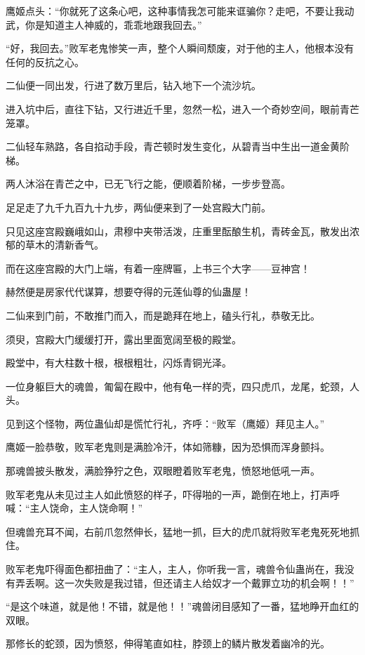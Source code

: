 \begin{this_body}
鹰姬点头：“你就死了这条心吧，这种事情我怎可能来诓骗你？走吧，不要让我动武，你是知道主人神威的，乖乖地跟我回去。”

“好，我回去。”败军老鬼惨笑一声，整个人瞬间颓废，对于他的主人，他根本没有任何的反抗之心。

二仙便一同出发，行进了数万里后，钻入地下一个流沙坑。

进入坑中后，直往下钻，又行进近千里，忽然一松，进入一个奇妙空间，眼前青芒笼罩。

二仙轻车熟路，各自掐动手段，青芒顿时发生变化，从碧青当中生出一道金黄阶梯。

两人沐浴在青芒之中，已无飞行之能，便顺着阶梯，一步步登高。

足足走了九千九百九十九步，两仙便来到了一处宫殿大门前。

只见这座宫殿巍峨如山，肃穆中夹带活泼，庄重里酝酿生机，青砖金瓦，散发出浓郁的草木的清新香气。

而在这座宫殿的大门上端，有着一座牌匾，上书三个大字——豆神宫！

赫然便是房家代代谋算，想要夺得的元莲仙尊的仙蛊屋！

二仙来到门前，不敢推门而入，而是跪拜在地上，磕头行礼，恭敬无比。

须臾，宫殿大门缓缓打开，露出里面宽阔至极的殿堂。

殿堂中，有大柱数十根，根根粗壮，闪烁青铜光泽。

一位身躯巨大的魂兽，匍匐在殿中，他有龟一样的壳，四只虎爪，龙尾，蛇颈，人头。

见到这个怪物，两位蛊仙却是慌忙行礼，齐呼：“败军（鹰姬）拜见主人。”

鹰姬一脸恭敬，败军老鬼则是满脸冷汗，体如筛糠，因为恐惧而浑身颤抖。

那魂兽披头散发，满脸狰狞之色，双眼瞪着败军老鬼，愤怒地低吼一声。

败军老鬼从未见过主人如此愤怒的样子，吓得啪的一声，跪倒在地上，打声呼喊：“主人饶命，主人饶命啊！”

但魂兽充耳不闻，右前爪忽然伸长，猛地一抓，巨大的虎爪就将败军老鬼死死地抓住。

败军老鬼吓得面色都扭曲了：“主人，主人，你听我一言，魂兽令仙蛊尚在，我没有弄丢啊。这一次失败是我过错，但还请主人给奴才一个戴罪立功的机会啊！！”

“是这个味道，就是他！不错，就是他！！”魂兽闭目感知了一番，猛地睁开血红的双眼。

那修长的蛇颈，因为愤怒，伸得笔直如柱，脖颈上的鳞片散发着幽冷的光。


\end{this_body}
